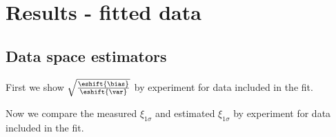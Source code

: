 \section{Results - fitted data}

\subsection{Data space estimators}

First we show $\sqrt{\frac{\eshift{\bias}}{\eshift{\var}}}$ by experiment
for data included in the fit.

Now we compare the measured $\xi_{1\sigma}$ and estimated $\xi_{1\sigma}$ by experiment
for data included in the fit.